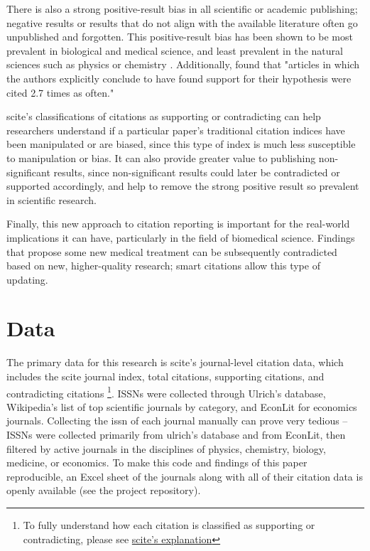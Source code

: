 \documentclass[12pt,english]{article}
\begin{document}
There is also a strong positive-result bias in all scientific or academic publishing; negative results or results that do not align with the available literature often go unpublished and forgotten. This positive-result bias has been shown to be most prevalent in biological and medical science, and least prevalent in the natural sciences such as physics or chemistry \citep{duyx_scientific_2017}. Additionally, \cite{duyx_scientific_2017} found that "articles in which the authors explicitly conclude to have found support for their hypothesis were cited 2.7 times as often."

scite's classifications of citations as supporting or contradicting can help researchers understand if a particular paper's traditional citation indices have been manipulated or are biased, since this type of index is much less susceptible to manipulation or bias. It can also provide greater value to publishing non-significant results, since non-significant results could later be contradicted or supported accordingly, and help to remove the strong positive result so prevalent in scientific research. 

Finally, this new approach to citation reporting is important for the real-world implications it can have, particularly in the field of biomedical science. Findings that propose some new medical treatment can be subsequently contradicted based on new, higher-quality research; smart citations allow this type of updating.


\section{Data}\label{sec:data}

The primary data for this research is scite's journal-level citation data, which includes the scite journal index, total citations, supporting citations, and contradicting citations \footnote{To fully understand how each citation is classified as supporting or contradicting, please see \href{https://scite.ai/#learn-more}{scite's explanation}}. ISSNs were collected through Ulrich's database, Wikipedia's list of top scientific journals by category, and EconLit for economics journals. Collecting the issn of each journal manually can prove very tedious -- ISSNs were collected primarily from ulrich's database and from EconLit, then filtered by active journals in the disciplines of physics, chemistry, biology, medicine, or economics. To make this code and findings of this paper reproducible, an Excel sheet of the journals along with all of their citation data is openly available (see the project repository).
\end{document}
